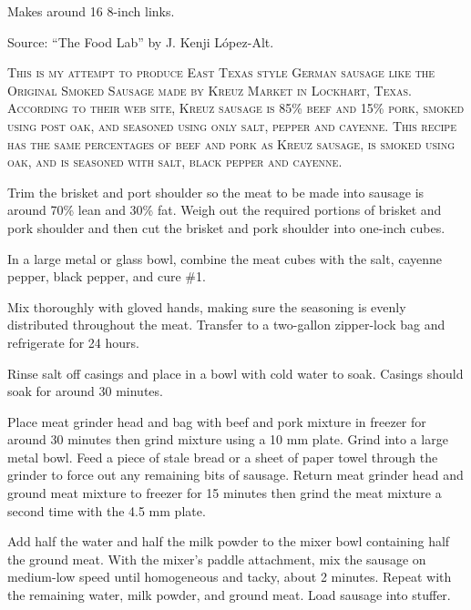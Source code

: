 \documentclass[letterpaper]{recipePMG}
\begin{document}
Makes around 16 8-inch links.

Source: ``The Food Lab'' by J. Kenji L\'{o}pez-Alt.

\newpage
{}
\label{TexasSausage}


\textsc{This is my attempt to produce East Texas style German sausage like the Original Smoked Sausage made by Kreuz Market in Lockhart, Texas. According to their web site, Kreuz sausage is 85\% beef and 15\% pork, smoked using post oak, and seasoned using only salt, pepper and cayenne. This recipe has the same percentages of beef and pork as Kreuz sausage, is smoked using oak, and is seasoned with salt, black pepper and cayenne.}

Trim the brisket and port shoulder so the meat to be made into sausage is around 70\% lean and 30\% fat. Weigh out the required portions of brisket and pork shoulder and then
cut the brisket and pork shoulder into one-inch cubes. 

In a large metal or glass bowl, combine the meat cubes with the salt, cayenne pepper, black pepper, and cure \#1.

Mix thoroughly with gloved hands, making sure the seasoning is evenly distributed throughout the meat. Transfer to a two-gallon zipper-lock bag and refrigerate for 24 hours.

Rinse salt off casings and place in a bowl with cold water to soak.  Casings should soak for around 30 minutes.

Place meat grinder head and bag with beef and pork mixture in freezer for around 30 minutes then grind mixture using a 10 mm plate. Grind into a large metal bowl. Feed a piece of stale bread or a sheet of paper towel through the grinder to force out any remaining bits of sausage. Return meat grinder head and ground meat mixture to freezer for 15 minutes then grind the meat mixture a second time with the 4.5 mm plate.

Add half the water and half the milk powder to the mixer bowl containing half the ground meat. With the mixer's paddle attachment, mix the sausage on medium-low speed until homogeneous and tacky, about 2 minutes. Repeat with the remaining water, milk powder, and ground meat. Load sausage into stuffer. 
\end{document}
